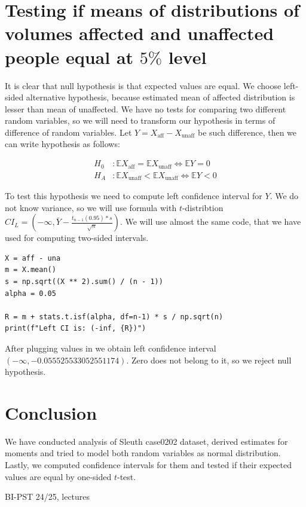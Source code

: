 \documentclass[12pt,a4paper]{article} %
\newcommand{\randv}[2][X]{#1_{\text{#2}}}
\newcommand{\E}{\mathbb{E}}
\begin{document}
\section{Testing if means of distributions of volumes affected and unaffected people equal at $5\%$ level}

It is clear that null hypothesis is that expected values are equal. We choose left-sided alternative hypothesis, because estimated mean of affected distribution is lesser than mean of unaffected. We have no tests for comparing two different random variables, so we will need to transform our hypothesis in terms of difference of random variables. Let $Y = \randv{aff} - \randv{unaff}$ be such difference, then we can write hypothesis as follows:

\begin{align*}
  H_0 &: \E\randv{aff} = \E\randv{unaff} \iff \E Y = 0\\
  H_A &: \E\randv{unaff} < \E\randv{unaff} \iff \E Y < 0
\end{align*}

To test this hypothesis we need to compute left confidence interval for $Y$. We do not know variance, so we will use formula with $t$-distribtion $CI_L = (-\infty, \bar Y - \frac{t_{n-1}(0.95) * s}{\sqrt{n}})$. We will use almost the same code, that we have used for computing two-sided intervals.

\begin{lstlisting}
X = aff - una
m = X.mean()
s = np.sqrt((X ** 2).sum() / (n - 1))
alpha = 0.05

R = m + stats.t.isf(alpha, df=n-1) * s / np.sqrt(n)
print(f"Left CI is: (-inf, {R})")
\end{lstlisting}

After plugging values in we obtain left confidence interval $(-\infty, -0.055525533052551174)$. Zero does not belong to it, so we reject null hypothesis.


\section{Conclusion}
We have conducted analysis of Sleuth case0202 dataset, derived estimates for moments and tried to model both random variables as normal distribution. Lastly, we computed confidence intervals for them and tested if their expected values are equal by one-sided $t$-test.


\begin{thebibliography}{99}
 BI-PST 24/25, lectures
\end{thebibliography}
\end{document}
